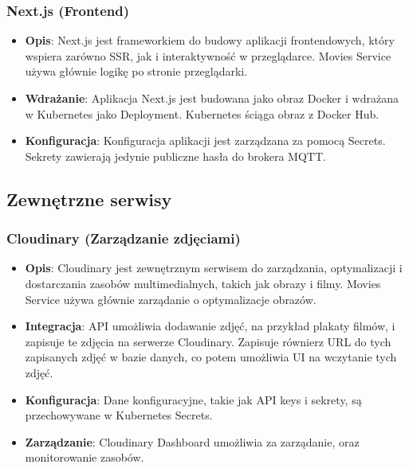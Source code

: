 \documentclass[12pt,a4paper]{article}
\begin{document}
\newpage

\subsubsection{Next.js (Frontend)}
\begin{itemize}
    \item \textbf{Opis}: Next.js jest frameworkiem do budowy aplikacji frontendowych, który wspiera zarówno SSR, jak i interaktywność w przeglądarce. Movies Service używa głównie logikę po stronie przeglądarki.
    \item \textbf{Wdrażanie}: Aplikacja Next.js jest budowana jako obraz Docker i wdrażana w Kubernetes jako Deployment. Kubernetes ściąga obraz z Docker Hub.
    \item \textbf{Konfiguracja}: Konfiguracja aplikacji jest zarządzana za pomocą Secrets. Sekrety zawierają jedynie publiczne hasła do brokera MQTT.
\end{itemize}

\subsection{Zewnętrzne serwisy}

\subsubsection{Cloudinary (Zarządzanie zdjęciami)}
\begin{itemize}
    \item \textbf{Opis}: Cloudinary jest zewnętrznym serwisem do zarządzania, optymalizacji i dostarczania zasobów multimedialnych, takich jak obrazy i filmy. Movies Service używa głównie zarządanie o optymalizacje obrazów.
    \item \textbf{Integracja}: API umożliwia dodawanie zdjęć, na przykład plakaty filmów, i zapisuje te zdjęcia na serwerze Cloudinary. Zapisuje równierz URL do tych zapisanych zdjęć w bazie danych, co potem umożliwia UI na wczytanie tych zdjęć.
    \item \textbf{Konfiguracja}: Dane konfiguracyjne, takie jak API keys i sekrety, są przechowywane w Kubernetes Secrets.
    \item \textbf{Zarządzanie}: Cloudinary Dashboard umożliwia za zarządanie, oraz monitorowanie zasobów.
\end{itemize}
\end{document}

